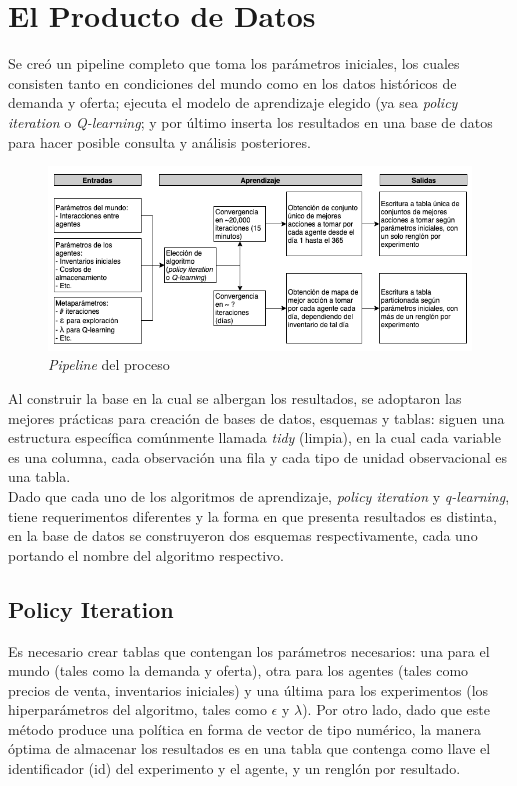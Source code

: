 \chapter{El Producto de Datos}

Se cre\'o un pipeline completo que toma los par\'ametros iniciales, los cuales consisten tanto en condiciones del mundo como en los datos hist\'oricos de demanda y oferta; ejecuta el modelo de aprendizaje elegido (ya sea \textit{policy iteration} o \textit{Q-learning}; y por \'ultimo inserta los resultados en una base de datos para hacer posible consulta y an\'alisis posteriores.\\

\begin{figure}[ht]
\caption{\textit{Pipeline} del proceso}
\label{pipeline}
\includegraphics[width=15cm]{tesis_tex/figs/pipeline.PNG}
\centering
\end{figure}

Al construir la base en la cual se albergan los resultados, se adoptaron las mejores pr\'acticas para creaci\'on de bases de datos, esquemas y tablas: siguen una estructura espec\'ifica com\'unmente llamada \textit{tidy} (limpia), en la cual cada variable es una columna, cada observaci\'on una fila y cada tipo de unidad observacional es una tabla.\\

Dado que cada uno de los algoritmos de aprendizaje, \textit{policy iteration} y \textit{q-learning}, tiene requerimentos diferentes y la forma en que presenta resultados es distinta, en la base de datos se construyeron dos esquemas respectivamente, cada uno portando el nombre del algoritmo respectivo.

\section{Policy Iteration}

Es necesario crear tablas que contengan los par\'ametros necesarios: una para el mundo (tales como la demanda y oferta), otra para los agentes (tales como precios de venta, inventarios iniciales) y una \'ultima para los experimentos (los hiperpar\'ametros del algoritmo, tales como $\epsilon$ y $\lambda$). Por otro lado, dado que este m\'etodo produce una pol\'itica en forma de vector de tipo num\'erico, la manera \'optima de almacenar los resultados es en una tabla que contenga como llave el identificador (id) del experimento y el agente, y un rengl\'on por resultado.\\ 


